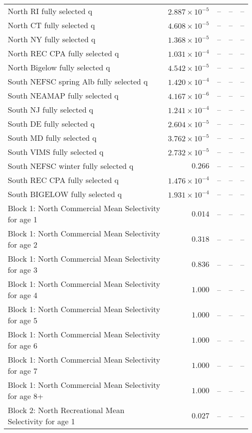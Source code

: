 \documentclass[
]{article}
\begin{document}
\begin{landscape}
\begin{longtable}[t]{lrrrr}
North RI fully selected q & $2.887\times 10^{-5}$ & -- & -- & --\\
North CT fully selected q & $4.608\times 10^{-5}$ & -- & -- & --\\
North NY fully selected q & $1.368\times 10^{-5}$ & -- & -- & --\\
\addlinespace
North REC CPA fully selected q & $1.031\times 10^{-4}$ & -- & -- & --\\
North Bigelow fully selected q & $4.542\times 10^{-5}$ & -- & -- & --\\
South NEFSC spring Alb fully selected q & $1.420\times 10^{-4}$ & -- & -- & --\\
South NEAMAP fully selected q & $4.167\times 10^{-6}$ & -- & -- & --\\
South NJ fully selected q & $1.241\times 10^{-4}$ & -- & -- & --\\
\addlinespace
South DE fully selected q & $2.604\times 10^{-5}$ & -- & -- & --\\
South MD fully selected q & $3.762\times 10^{-5}$ & -- & -- & --\\
South VIMS fully selected q & $2.732\times 10^{-5}$ & -- & -- & --\\
South NEFSC winter fully selected q & $0.266$ & -- & -- & --\\
South REC CPA fully selected q & $1.476\times 10^{-4}$ & -- & -- & --\\
\addlinespace
South BIGELOW fully selected q & $1.931\times 10^{-4}$ & -- & -- & --\\
Block 1: North Commercial Mean Selectivity for age 1 & $0.014$ & -- & -- & --\\
Block 1: North Commercial Mean Selectivity for age 2 & $0.318$ & -- & -- & --\\
Block 1: North Commercial Mean Selectivity for age 3 & $0.836$ & -- & -- & --\\
Block 1: North Commercial Mean Selectivity for age 4 & $1.000$ & -- & -- & --\\
\addlinespace
Block 1: North Commercial Mean Selectivity for age 5 & $1.000$ & -- & -- & --\\
Block 1: North Commercial Mean Selectivity for age 6 & $1.000$ & -- & -- & --\\
Block 1: North Commercial Mean Selectivity for age 7 & $1.000$ & -- & -- & --\\
Block 1: North Commercial Mean Selectivity for age 8+ & $1.000$ & -- & -- & --\\
Block 2: North Recreational Mean Selectivity for age 1 & $0.027$ & -- & -- & --\\

\end{longtable}
\end{landscape}
\end{document}
